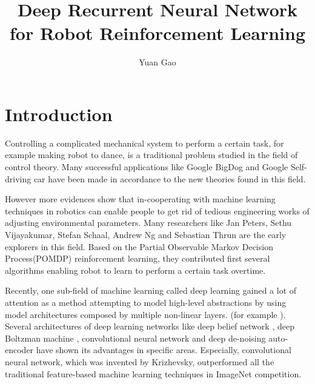 \documentclass[officiallayout]{tktla}
\title{Deep Recurrent Neural Network for Robot Reinforcement Learning \\}
\author{Yuan Gao}
\begin{document}
\frontmatter

\maketitle
\listoftodos
\begin{abstract}

\end{abstract}

\begin{acknowledgements}

\end{acknowledgements}

\tableofcontents

\mainmatter
\chapter{Introduction}

Controlling a complicated mechanical system to perform a certain task, for example making robot to dance, is a traditional problem studied in the field of control theory. Many successful applications like Google BigDog\cite{Raibert2008} and Google Self-driving car \cite{Guizzo2011a} have been made in accordance to the new theories found in this field.

However more evidences show that in-cooperating with machine learning techniques in robotics can enable people to get rid of tedious engineering works of adjusting environmental parameters. Many researchers like Jan Peters, Sethu Vijayakumar, Stefan Schaal, Andrew Ng and Sebastian Thrun are the early explorers in this field. Based on the Partial Observable Markov Decision Process(POMDP) reinforcement learning, they contributed first several algorithms enabling robot to learn to perform a certain task overtime.

Recently, one sub-field of machine learning called deep learning gained a lot of attention as a method attempting to model high-level abstractions by using model architectures composed by multiple non-linear layers. (for example \cite{Krizhevsky2012}). Several architectures of deep learning networks like deep belief network \cite{Hinton2006}, deep Boltzman machine \cite{Salakhutdinov2009}, convolutional neural network \cite{Krizhevsky2012} and deep de-noising auto-encoder \cite{Vincent2010} have shown its advantages in specific areas. Especially, convolutional neural network, which was invented by Krizhevsky, outperformed all the traditional feature-based machine learning techniques in ImageNet competition.
\end{document}
